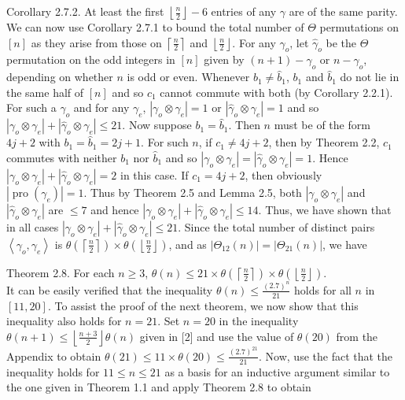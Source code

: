 \documentclass[10pt]{article}
\begin{document}
Corollary 2.7.2. At least the first $\left\lfloor\frac{n}{2}\right\rfloor-6$ entries of any $\gamma$ are of the same parity.\\
We can now use Corollary 2.7.1 to bound the total number of $\Theta$ permutations on $[n]$ as they arise from those on $\left\lceil\frac{n}{2}\right\rceil$ and $\left\lfloor\frac{n}{2}\right\rfloor$. For any $\gamma_{o}$, let $\widehat{\gamma}_{o}$ be the $\Theta$ permutation on the odd integers in $[n]$ given by $(n+1)-\gamma_{o}$ or $n-\gamma_{o}$, depending on whether $n$ is odd or even. Whenever $b_{1} \neq \widehat{b}_{1}$, $b_{1}$ and $\widehat{b}_{1}$ do not lie in the same half of $[n]$ and so $c_{1}$ cannot commute with both (by Corollary 2.2.1). For such a $\gamma_{o}$ and for any $\gamma_{e}$, $\left|\gamma_{o} \otimes \gamma_{e}\right|=1$ or $\left|\widehat{\gamma}_{o} \otimes \gamma_{e}\right|=1$ and so $\left|\gamma_{o} \otimes \gamma_{e}\right|+\left|\widehat{\gamma}_{o} \otimes \gamma_{e}\right| \leq 21$. Now suppose $b_{1}=\widehat{b}_{1}$. Then $n$ must be of the form $4 j+2$ with $b_{1}=\widehat{b}_{1}=2 j+1$. For such $n$, if $c_{1} \neq 4 j+2$, then by Theorem 2.2, $c_{1}$ commutes with neither $b_{1}$ nor $\widehat{b}_{1}$ and so $\left|\gamma_{o} \otimes \gamma_{e}\right|=\left|\widehat{\gamma}_{o} \otimes \gamma_{e}\right|=1$. Hence $\left|\gamma_{o} \otimes \gamma_{e}\right|+\left|\widehat{\gamma}_{o} \otimes \gamma_{e}\right|=2$ in this case. If $c_{1}=4 j+2$, then obviously $\left|\operatorname{pro}\left(\gamma_{e}\right)\right|=1$. Thus by Theorem 2.5 and Lemma 2.5, both $\left|\gamma_{o} \otimes \gamma_{e}\right|$ and $\left|\widehat{\gamma}_{o} \otimes \gamma_{e}\right|$ are $\leq 7$ and hence $\left|\gamma_{o} \otimes \gamma_{e}\right|+\left|\widehat{\gamma}_{o} \otimes \gamma_{e}\right| \leq 14$. Thus, we have shown that in all cases $\left|\gamma_{o} \otimes \gamma_{e}\right|+\left|\widehat{\gamma}_{o} \otimes \gamma_{e}\right| \leq 21$. Since the total number of distinct pairs $\left\langle\gamma_{o}, \gamma_{e}\right\rangle$ is $\theta\left(\left\lceil\frac{n}{2}\right\rceil\right) \times \theta\left(\left\lfloor\frac{n}{2}\right\rfloor\right)$, and as $\left|\Theta_{12}(n)\right|=\left|\Theta_{21}(n)\right|$, we have

Theorem 2.8. For each $n \geq 3$, $\theta(n) \leq 21 \times \theta\left(\left\lceil\frac{n}{2}\right\rceil\right) \times \theta\left(\left\lfloor\frac{n}{2}\right\rfloor\right)$.\\
It can be easily verified that the inequality $\theta(n) \leq \frac{(2.7)^{n}}{21}$ holds for all $n$ in $[11,20]$. To assist the proof of the next theorem, we now show that this inequality also holds for $n=21$. Set $n=20$ in the inequality $\theta(n+1) \leq\left\lfloor\frac{n+3}{2}\right\rfloor \theta(n)$ given in [2] and use the value of $\theta(20)$ from the Appendix to obtain $\theta(21) \leq 11 \times \theta(20) \leq \frac{(2.7)^{21}}{21}$. Now, use the fact that the inequality holds for $11 \leq n \leq 21$ as a basis for an inductive argument similar to the one given in Theorem 1.1 and apply Theorem 2.8 to obtain
\end{document}
